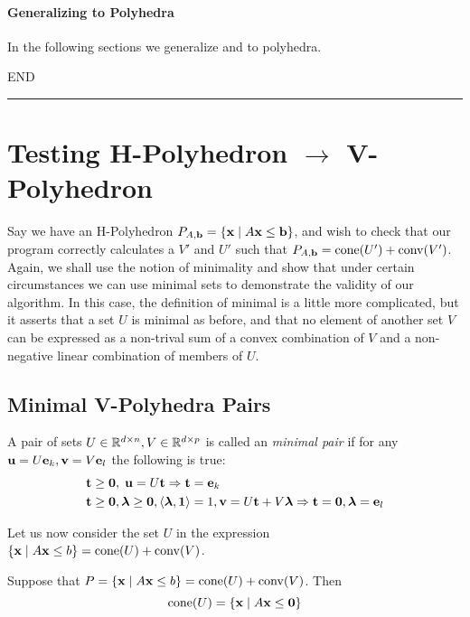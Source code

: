 \paragraph{Generalizing to Polyhedra}  In the following sections we generalize  and  to polyhedra.

END
\hrule

\section{Testing H-Polyhedron $\to$ V-Polyhedron}

Say we have an H-Polyhedron $P_{A,\mathbf{b}} = \left\{\mathbf{x}\;|\; A\mathbf{x}\leq \mathbf{b}\right\}$, and wish to check that our program correctly calculates a $V'$ and $U'$ such that $P_{A,\mathbf{b}} = \operatorname{cone}(U') + \operatorname{conv}(V')$.  Again, we shall use the notion of minimality and show that under certain circumstances we can use minimal sets to demonstrate the validity of our algorithm.  In this case, the definition of minimal is a little more complicated, but it asserts that a set $U$ is minimal as before, and that no element of another set $V$ can be expressed as a non-trival sum of a convex combination of $V$ and a non-negative linear combination of members of $U$.

\subsection{Minimal V-Polyhedra Pairs}
\begin{Def}{ A pair of sets $U\in\mathbb{R}^{d\times n}, V\in\mathbb{R}^{d\times p}$ is called an \textit{minimal pair} if for any $\mathbf{u} = U\mathbf{e}_k, \mathbf{v} = V\mathbf{e}_l$ the following is true:
		\begin{alignat*}{1}
			 & \mathbf{t} \geq \mathbf{0},\; \mathbf{u} = U\mathbf{t} \Rightarrow \mathbf{t} = \mathbf{e}_k                              \\
			 & \mathbf{t} \geq \mathbf{0}, \bm{\lambda} \geq \mathbf{0}, \left\langle \bm{\lambda}, \mathbf{1} \right\rangle = 1, \mathbf{v} = U\mathbf{t} + V\bm{\lambda}
			\Rightarrow \mathbf{t} = \mathbf{0}, \bm{\lambda} = \mathbf{e}_l
		\end{alignat*}
	}\end{Def}

Let us now consider the set $U$ in the expression $\left\{\mathbf{x}\;|\; A\mathbf{x}\leq b\right\} = \operatorname{cone}(U) + \operatorname{conv}(V)$.

\begin{Prop}\label{characteristic_cone}
	Suppose that $P = \left\{\mathbf{x}\;|\; A\mathbf{x}\leq b\right\} = \operatorname{cone}(U) + \operatorname{conv}(V)$.  Then
	\[ \operatorname{cone}(U) = \left\{\mathbf{x}\;|\; A\mathbf{x}\leq\mathbf{0}\right\} \]
\end{Prop}

